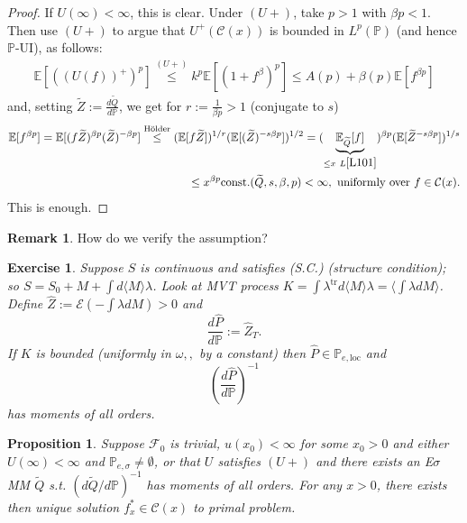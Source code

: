 \documentclass[12pt,a4paper, twoside]{article}
\newtheorem{prop}{Proposition}[section]
\newtheorem{exe}{Exercise}[section]
\theoremstyle{definition}
\newtheorem{rem}{Remark}[section]
\newcommand{\EE}{\mathbb{E}} %
\newcommand{\PP}{\mathbb{P}} %
\begin{document}
\begin{proof}
If $U( \infty) < \infty$, this is clear. Under $(U+)$,  take $p>1$ with $\beta p <1$. Then use $(U+)$ to argue that $U^+( \mathcal{C}(x))$ is bounded in $L^p(\PP)$ (and hence $\PP$-UI), as follows: 
\begin{align*}
\EE[((U(f))^+)^p] \overset{(U+)}\leq k^p \EE[(1+f^\beta)^p] \leq A(p) + \beta (p) \EE[f^{\beta p}]
\end{align*}
and, setting $\widetilde{Z}:= \frac{d \widetilde{Q}}{d \PP}$, we get for $r:= \frac{1}{\beta p}>1$ (conjugate to $s$)
\begin{align*}
\EE[f^{\beta p}] = \EE[(f \widetilde{Z})^{ \beta p} ( \widetilde{Z})^{- \beta p}] \overset{\text{Hölder}}\leq ( \EE[f \widetilde{Z}])^{1/r} ( \EE[ ( \widetilde{Z})^{-s \beta p}])^{1/2} = ( \underbrace{\EE_{\widetilde{Q}} [f]}_{ \leq x \ L \ref{L101}})^{\beta p} ( \EE[ \widetilde{Z}^{- s \beta p}])^{1/s} \\
\leq x^{\beta p} \text{const.}(\widetilde{Q}, s,\beta ,  p) < \infty, \text{ uniformly over } f  \in \mathcal{C}(x).
\end{align*}
This is enough.
\end{proof}
\begin{rem} How do we verify the assumption?
\begin{exe} Suppose $S$ is continuous and satisfies (S.C.) (structure condition); so $S= S_0 + M + \int d \langle M \rangle \lambda$. Look at MVT process $K= \int \lambda^\text{tr} d \langle M \rangle \lambda = \langle \int \lambda d M \rangle$. Define $\hat{Z}:= \mathcal{E}( - \int \lambda dM ) >0$ and $$\frac{d \hat{P}}{d \PP}:= \hat{Z}_T.$$ If $K$ is bounded (uniformly in $\omega, ,$ by a constant) then $\hat{P} \in \PP_{e,  \text{loc}}$ and $$\left( \frac{d \hat{P}}{d \PP}\right)^{-1}$$ has moments of all orders. 
\end{exe}
\end{rem}
\begin{prop} \label{P133} Suppose $\mathcal{F}_0$ is trivial,  $u(x_0) < \infty$ for some $x_0 >0$ and either $U( \infty) < \infty$ and $\PP_{e, \sigma} \neq \emptyset$, or that $U$ satisfies $(U+)$ and there exists an E$\sigma$MM $\widetilde{Q}$ s.t. $(d \widetilde{Q} / d \PP)^{-1}$ has moments of all orders. For any $x>0$, there exists then unique solution $f_x^* \in \mathcal{C}(x)$ to primal problem. 
\end{prop}
\end{document}
